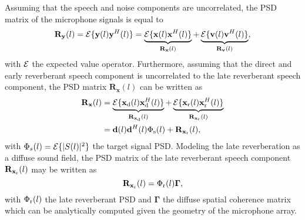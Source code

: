 \documentclass{article}
\begin{document}
Assuming that the speech and noise components are uncorrelated, the PSD matrix of the microphone signals is equal to
\begin{equation}
  \label{eq: Ry}
\mathbf{R}_{\mathbf{y}}(l) = {\cal{E}} \{\mathbf{y}(l)\mathbf{y}^H(l) \} = \underbrace{{\cal{E}} \{\mathbf{x}(l)\mathbf{x}^H(l) \}}_{\mathbf{R}_{\mathbf{x}}(l)} + \underbrace{{\cal{E}} \{\mathbf{v}(l)\mathbf{v}^H(l) \}}_{\mathbf{R}_{\mathbf{v}}(l)},
\end{equation}
with ${\cal{E}}$ the expected value operator.
Furthermore, assuming that the direct and early reverberant speech component is uncorrelated to the late reverberant speech component, the PSD matrix $\mathbf{R}_{\mathbf{x}}(l)$ can be written as
\begin{align}
  \mathbf{R}_{\mathbf{x}}(l) & = \underbrace{{\cal{E}} \{\mathbf{x}_{\rm d}(l)\mathbf{x}_{\rm d}^H(l) \}}_{\mathbf{R}_{\mathbf{x}_{\rm d}}(l)} + \underbrace{{\cal{E}} \{\mathbf{x}_{\rm r}(l)\mathbf{x}_{\rm r}^H(l) \}}_{\mathbf{R}_{\mathbf{x}_{\rm r}}(l)} \\
\label{eq: Rx}
& = \mathbf{d}(l)\mathbf{d}^H(l) \Phi_{\rm s}(l) + \mathbf{R}_{\mathbf{x}_{\rm r}}(l),
\end{align}
with $\Phi_s(l) = {\cal{E}}\{|S(l)|^2\}$ the target signal PSD.
Modeling the late reverberation as a diffuse sound field, the PSD matrix of the late reverberant speech component $\mathbf{R}_{\mathbf{x}_{\rm r}}(l)$ may be written as~\cite{Braun_EUSIPCO_2013,Braun_EURASIP_2015,Schwartz_WASPAA_2015,Schwartz_ICASSP_2016}
\begin{equation}
\label{eq: reverb_model}
\mathbf{R}_{\mathbf{x}_{\rm r}}(l) = \Phi_{\rm r}(l) \boldsymbol{\Gamma},
\end{equation}
with $\Phi_{\rm r}(l)$ the late reverberant PSD and $\boldsymbol{\Gamma}$ the diffuse spatial coherence matrix which can be analytically computed given the geometry of the microphone array. 
\end{document}
